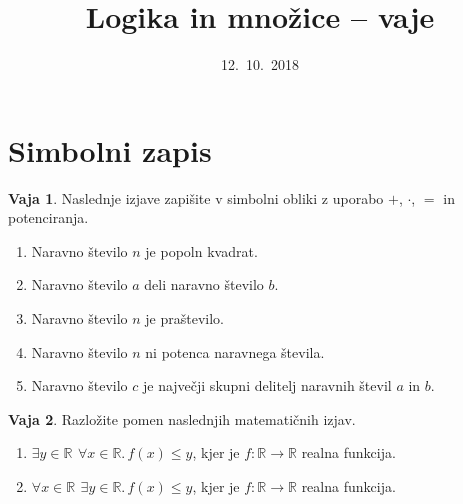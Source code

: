 \documentclass{article}
\theoremstyle{definition}
\newtheorem{vaja}{Vaja}[section]
\begin{document}
\title{Logika in množice -- vaje}
\date{12.~10.~2018}
\maketitle

\setcounter{section}{1}
\section{Simbolni zapis}

\bigskip\medskip

\begin{vaja}
Naslednje izjave zapišite v simbolni obliki z uporabo $+$, $\cdot$, $=$ in potenciranja.
 \begin{enumerate}
 \item Naravno število $n$ je popoln kvadrat.  %
 \item Naravno število $a$ deli naravno število $b$. %
 \item Naravno število $n$ je praštevilo.%
  \item Naravno število $n$ ni potenca naravnega števila.%
  \item Naravno število $c$ je največji skupni delitelj naravnih števil $a$ in $b$. %
 
\end{enumerate}
\end{vaja}

\begin{vaja}
Razložite pomen naslednjih matematičnih izjav.
\begin{enumerate}
 \item $\exists y \in \mathbb{R}\,\ \forall x \in \mathbb{R}. \,  f(x) \leq y$, kjer je $f \colon \mathbb{R} \to \mathbb{R}$ realna funkcija.
 \item $\forall x \in \mathbb{R}\,\ \exists y \in \mathbb{R}. \,  f(x) \leq y$, kjer je $f \colon \mathbb{R} \to \mathbb{R}$ realna funkcija.
 \end{enumerate}
\end{vaja}
\end{document}
